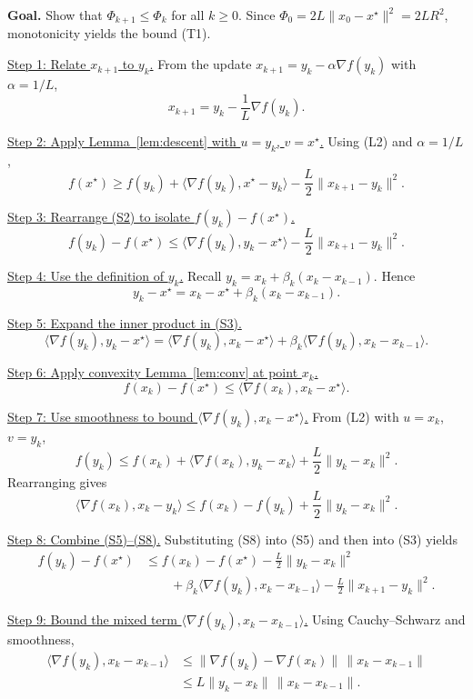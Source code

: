 \documentclass{article}
\newcommand{\grad}{\nabla}
\begin{document}
\noindent\textbf{Goal.} Show that $\Phi_{k+1}\le \Phi_k$ for all $k\ge0$.  
Since $\Phi_0=2L\|x_0-x^{\star}\|^{2}=2LR^{2}$, monotonicity yields the bound (T1).

\medskip
\noindent\underline{Step 1: Relate $x_{k+1}$ to $y_k$.}  
From the update $x_{k+1}=y_k-\alpha\grad f(y_k)$ with $\alpha=1/L$,
\[
x_{k+1}=y_k-\frac{1}{L}\grad f(y_k).
\tag{S1}
\]

\noindent\underline{Step 2: Apply Lemma~\ref{lem:descent} with $u=y_k$, $v=x^{\star}$.}  
Using (L2) and $\alpha=1/L$,
\[
f(x^{\star})\ge f(y_k)+\langle\grad f(y_k),x^{\star}-y_k\rangle-\frac{L}{2}\|x_{k+1}-y_k\|^{2}.
\tag{S2}
\]

\noindent\underline{Step 3: Rearrange (S2) to isolate $f(y_k)-f(x^{\star})$.}  
\[
f(y_k)-f(x^{\star})\le \langle\grad f(y_k),y_k-x^{\star}\rangle-\frac{L}{2}\|x_{k+1}-y_k\|^{2}.
\tag{S3}
\]

\noindent\underline{Step 4: Use the definition of $y_k$.}  
Recall $y_k=x_k+\beta_k (x_k-x_{k-1})$. Hence
\[
y_k-x^{\star}=x_k-x^{\star}+\beta_k (x_k-x_{k-1}).
\tag{S4}
\]

\noindent\underline{Step 5: Expand the inner product in (S3).}  
\[
\langle\grad f(y_k),y_k-x^{\star}\rangle
= \langle\grad f(y_k),x_k-x^{\star}\rangle
  +\beta_k\langle\grad f(y_k),x_k-x_{k-1}\rangle.
\tag{S5}
\]

\noindent\underline{Step 6: Apply convexity Lemma~\ref{lem:conv} at point $x_k$.}  
\[
f(x_k)-f(x^{\star})\le \langle\grad f(x_k),x_k-x^{\star}\rangle.
\tag{S6}
\]

\noindent\underline{Step 7: Use smoothness to bound $\langle\grad f(y_k),x_k-x^{\star}\rangle$.}  
From (L2) with $u=x_k$, $v=y_k$,
\[
f(y_k)\le f(x_k)+\langle\grad f(x_k),y_k-x_k\rangle+\frac{L}{2}\|y_k-x_k\|^{2}.
\tag{S7}
\]
Rearranging gives
\[
\langle\grad f(x_k),x_k-y_k\rangle\le f(x_k)-f(y_k)+\frac{L}{2}\|y_k-x_k\|^{2}.
\tag{S8}
\]

\noindent\underline{Step 8: Combine (S5)–(S8).}  
Substituting (S8) into (S5) and then into (S3) yields
\[
\begin{aligned}
f(y_k)-f(x^{\star})
&\le f(x_k)-f(x^{\star}) -\frac{L}{2}\|y_k-x_k\|^{2}\\
&\qquad +\beta_k\langle\grad f(y_k),x_k-x_{k-1}\rangle-\frac{L}{2}\|x_{k+1}-y_k\|^{2}.
\end{aligned}
\tag{S9}
\]

\noindent\underline{Step 9: Bound the mixed term $\langle\grad f(y_k),x_k-x_{k-1}\rangle$.}  
Using Cauchy–Schwarz and smoothness,
\[
\begin{aligned}
\langle\grad f(y_k),x_k-x_{k-1}\rangle
&\le \|\grad f(y_k)-\grad f(x_k)\|\,\|x_k-x_{k-1}\|\\
&\le L\|y_k-x_k\|\,\|x_k-x_{k-1}\|.
\end{aligned}
\tag{S10}
\]
\end{document}
